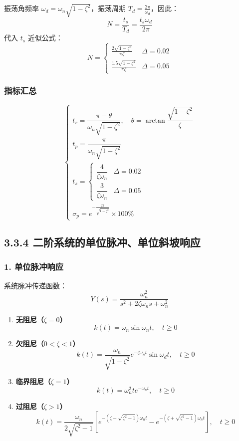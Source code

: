 振荡角频率 $\omega_d = \omega_n\sqrt{1-\zeta^2}$，振荡周期 $T_d=\frac{2\pi}{\omega_d}$，因此：
\[
N=\frac{t_s}{T_d}=\frac{t_s \omega_d}{2\pi}
\]
代入 $t_s$ 近似公式：
\[
N=
\begin{cases}
\displaystyle \frac{2\sqrt{1-\zeta^2}}{\pi\zeta} & \Delta=0.02 \\[4pt]
\displaystyle \frac{1.5\sqrt{1-\zeta^2}}{\pi\zeta} & \Delta=0.05
\end{cases}
\]

\subsubsection{指标汇总}
\[
\begin{cases}
t_r = \dfrac{\pi-\theta}{\omega_n\sqrt{1-\zeta^2}},\quad \theta=\arctan\dfrac{\sqrt{1-\zeta^2}}{\zeta}\\[6pt]
t_p = \dfrac{\pi}{\omega_n\sqrt{1-\zeta^2}}\\[6pt]
t_s =
\begin{cases}
\dfrac{4}{\zeta\omega_n} & \Delta=0.02\\[4pt]
\dfrac{3}{\zeta\omega_n} & \Delta=0.05
\end{cases}\\[6pt]
\sigma_p = e^{-\frac{\zeta\pi}{\sqrt{1-\zeta^2}}}\times 100\%
\end{cases}
\]

\subsection{3.3.4 二阶系统的单位脉冲、单位斜坡响应}
\subsubsection{1. 单位脉冲响应}
系统脉冲传递函数：
\[
Y(s)=\frac{\omega_n^2}{s^2+2\zeta\omega_n s+\omega_n^2}
\]
\begin{enumerate}
    \item \textbf{无阻尼（$\zeta=0$）}
    \[
    k(t)=\omega_n \sin\omega_n t,\quad t\ge0
    \]
    \item \textbf{欠阻尼（$0<\zeta<1$）}
    \[
    k(t)=\frac{\omega_n}{\sqrt{1-\zeta^2}}e^{-\zeta\omega_n t}\sin\omega_d t,\quad t\ge0
    \]
    \item \textbf{临界阻尼（$\zeta=1$）}
    \[
    k(t)=\omega_n^2 t e^{-\omega_n t},\quad t\ge0
    \]
    \item \textbf{过阻尼（$\zeta>1$）}
    \[
    k(t)=\frac{\omega_n}{2\sqrt{\zeta^2-1}}\left[e^{-(\zeta-\sqrt{\zeta^2-1})\omega_n t}-e^{-(\zeta+\sqrt{\zeta^2-1})\omega_n t}\right],\quad t\ge0
    \]
\end{enumerate}

